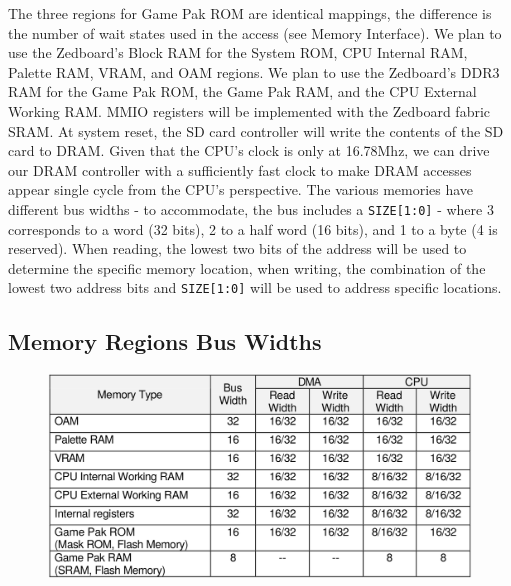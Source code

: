 \documentclass[11pt,a4paper,draft]{article}
\begin{document}
	The three regions for Game Pak ROM are identical mappings, the difference is the number of wait states used in the access (see Memory Interface). We plan to use the Zedboard's Block RAM for the System ROM,  CPU Internal RAM, Palette RAM, VRAM, and OAM regions. We plan to use the Zedboard's DDR3 RAM for the Game Pak ROM, the Game Pak RAM, and the CPU External Working RAM. MMIO registers will be implemented with the Zedboard fabric SRAM. At system reset, the SD card controller will write the contents of the SD card to DRAM. Given that the CPU's clock is only at 16.78Mhz, we can drive our DRAM controller with a sufficiently fast clock to make DRAM accesses appear single cycle from the CPU's perspective. The various memories have different bus widths - to accommodate, the bus includes a \texttt{SIZE[1:0]} - where 3 corresponds to a word (32 bits), 2 to a half word (16 bits), and 1 to a byte (4 is reserved). When reading, the lowest two bits of the address will be used to determine the specific memory location, when writing, the combination of the lowest two address bits and \texttt{SIZE[1:0]} will be used to address specific locations.\\
	\subsection{Memory Regions Bus Widths}
\begin{center} %
	\begin{figure}[ht!]
	\includegraphics[width=14cm, keepaspectratio=true]{accesstimes}
	\end{figure}\cite{GBAManual}
\end{center}
\end{document}
